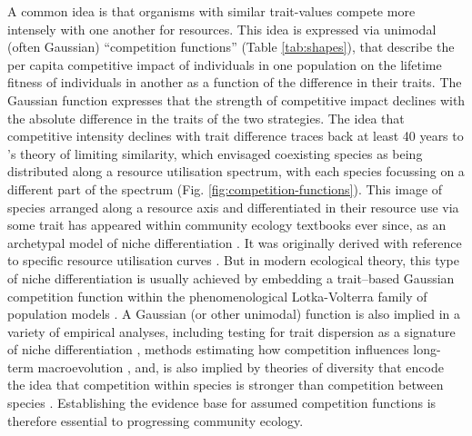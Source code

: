 \documentclass[a4paper,11pt]{article}
\begin{document}
A common idea is that organisms with similar trait-values compete more intensely with one another for resources. This idea is expressed via unimodal (often Gaussian) ``competition functions'' (Table \ref{tab:shapes}), that describe the per capita competitive impact of individuals in one population on the lifetime fitness of individuals in another as a function of the difference in their traits. The Gaussian function expresses that the strength of competitive impact declines with the absolute difference in the traits of the two strategies. The idea that competitive intensity declines with trait difference traces back at least 40 years to \citet{MacArthur-1967}’s theory of limiting similarity, which envisaged coexisting species as being distributed along a resource utilisation spectrum, with each species focussing on a different part of the spectrum (Fig. \ref{fig:competition-functions}). This image of species arranged along a resource axis and differentiated in their resource use via some trait has appeared within community ecology textbooks ever since, as an archetypal model of niche differentiation \citep[e.g.,][]{Krebs-1972, Ricklefs-1973, Ricklefs-1999, Krebs-2013}. It was originally derived with reference to specific resource utilisation curves \citep{MacArthur-1967, Roughgarden-1979}. But in modern ecological theory, this type of niche differentiation is usually achieved by embedding a trait--based Gaussian competition function within the phenomenological Lotka-Volterra family of population models \citep{Taper-1985, Case-2000, Dieckmann-1999, Leimar-2013, DAndrea-2019}. A Gaussian (or other unimodal) function is also implied in a variety of empirical analyses, including testing for trait dispersion as a signature of niche differentiation \citep{Kraft-2008, Adler-2013, Maire-2012}, methods estimating how competition influences long-term macroevolution \citep{Schluter-2000a, Harmon-2019, 
Fraser-2020a}, and, is also implied by theories of diversity that encode the idea that competition within species is stronger than competition between species \citep{Chesson-2000, Scheffer-2006}. Establishing the evidence base for assumed competition functions is therefore essential to progressing community ecology.
\end{document}
